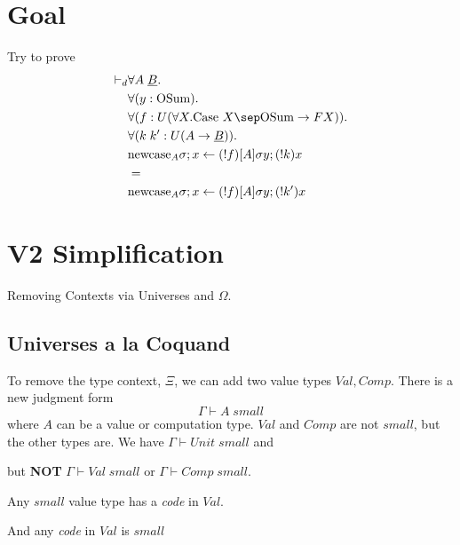 \documentclass{article}
\begin{document}
\section{Goal}
Try to prove 
\begin{align*}
    \vdash_d & \forall A \;\underline{B}. \\
    & \forall (y : \textrm{OSum}). \\
    & \forall (f : U(\forall X . \textrm{Case }X \sep \textrm{OSum} \rightarrow F X)). \\
    & \forall (k \; k' : U(A \rightarrow \underline{B})). \\
    & \textrm{newcase}_A \sigma ; x \leftarrow (!f)[A]\sigma y ; (!k) x  \\
    & = \\
    & \textrm{newcase}_A \sigma ; x \leftarrow (!f)[A]\sigma y ; (!k') x  
\end{align*}   

\section{V2 Simplification}
Removing Contexts via Universes and $\Omega$.
\subsection{Universes a la Coquand}
To remove the type context, $\Xi$, we can add two value types $Val,Comp$.
There is a new judgment form 
\[
    \Gamma \vdash A \;small    
\]
where $A$ can be a value or computation type. $Val$ and $Comp$ are not $small$, but the other types are.
We have $\Gamma \vdash Unit \; small$ and 
\begin{prooftree}
\end{prooftree}

but \textbf{NOT} $\Gamma \vdash Val \; small$ or $\Gamma \vdash Comp \; small$.

Any $small$ value type has a \textit{code} in $Val$. 
\begin{prooftree}
\end{prooftree}

And any \textit{code} in $Val$ is $small$

\begin{prooftree}
\end{prooftree}
\end{document}

